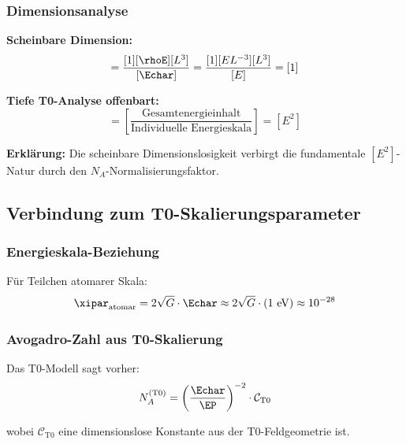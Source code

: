 	\subsubsection{Dimensionsanalyse}
	\label{subsubsec:mol_dimensionsanalyse}
	
	\textbf{Scheinbare Dimension:}
	\begin{equation}
		[n_{\text{T0}}] = \frac{[1][\rhoE][L^3]}{[\Echar]} = \frac{[1][E L^{-3}][L^3]}{[E]} = [1]
	\end{equation}
	
	\textbf{Tiefe T0-Analyse offenbart:}
	\begin{equation}
		[n_{\text{T0}}] = \left[\frac{\text{Gesamtenergieinhalt}}{\text{Individuelle Energieskala}}\right] = [E^2]
		\label{eq:mol_wahre_dimension}
	\end{equation}
	
	\textbf{Erklärung:} Die scheinbare Dimensionslosigkeit verbirgt die fundamentale $[E^2]$-Natur durch den $N_A$-Normalisierungsfaktor.
	
	\subsection{Verbindung zum T0-Skalierungsparameter}
	\label{subsec:mol_t0_skalierung}
	
	\subsubsection{Energieskala-Beziehung}
	\label{subsubsec:mol_energieskala}
	
	Für Teilchen atomarer Skala:
	\begin{equation}
		\xipar_{\text{atomar}} = 2\sqrt{G} \cdot \Echar \approx 2\sqrt{G} \cdot (1 \text{ eV}) \approx 10^{-28}
		\label{eq:xi_atomar}
	\end{equation}
	
	\subsubsection{Avogadro-Zahl aus T0-Skalierung}
	\label{subsubsec:avogadro_t0}
	
	Das T0-Modell sagt vorher:
	\begin{equation}
		N_A^{(\text{T0})} = \left(\frac{\Echar}{\EP}\right)^{-2} \cdot \mathcal{C}_{\text{T0}}
		\label{eq:avogadro_t0_vorhersage}
	\end{equation}
	
	wobei $\mathcal{C}_{\text{T0}}$ eine dimensionslose Konstante aus der T0-Feldgeometrie ist.
	
